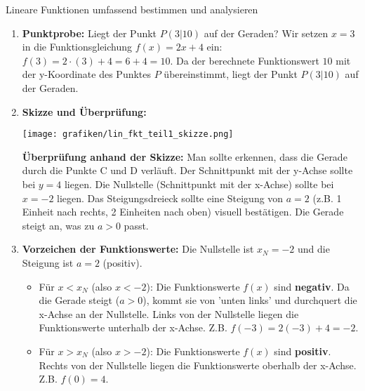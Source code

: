 \begin{loesungsumgebung}{Lineare Funktionen umfassend bestimmen und analysieren}
\begin{enumerate}[label=(\alph*)]
    \item \textbf{Punktprobe:} Liegt der Punkt $P(3|10)$ auf der Geraden?
    Wir setzen $x=3$ in die Funktionsgleichung $f(x) = 2x+4$ ein:
    $f(3) = 2 \cdot (3) + 4 = 6 + 4 = 10$.
    Da der berechnete Funktionswert $10$ mit der y-Koordinate des Punktes $P$ übereinstimmt, liegt der Punkt $P(3|10)$ auf der Geraden.

    \item \textbf{Skizze und Überprüfung:}
    \begin{center}
    \texttt{[image: grafiken/lin\_fkt\_teil1\_skizze.png]}
    \label{fig:lin_fkt_teil1}
    \end{center}
    \textbf{Überprüfung anhand der Skizze:} Man sollte erkennen, dass die Gerade durch die Punkte C und D verläuft. Der Schnittpunkt mit der y-Achse sollte bei $y=4$ liegen. Die Nullstelle (Schnittpunkt mit der x-Achse) sollte bei $x=-2$ liegen. Das Steigungsdreieck sollte eine Steigung von $a=2$ (z.B. 1 Einheit nach rechts, 2 Einheiten nach oben) visuell bestätigen. Die Gerade steigt an, was zu $a>0$ passt.

    \item \textbf{Vorzeichen der Funktionswerte:}
    Die Nullstelle ist $x_N = -2$ und die Steigung ist $a=2$ (positiv).
    \begin{itemize}
        \item Für $x < x_N$ (also $x < -2$): Die Funktionswerte $f(x)$ sind \textbf{negativ}. Da die Gerade steigt ($a>0$), kommt sie von 'unten links' und durchquert die x-Achse an der Nullstelle. Links von der Nullstelle liegen die Funktionswerte unterhalb der x-Achse. Z.B. $f(-3) = 2(-3)+4 = -2$.
        \item Für $x > x_N$ (also $x > -2$): Die Funktionswerte $f(x)$ sind \textbf{positiv}. Rechts von der Nullstelle liegen die Funktionswerte oberhalb der x-Achse. Z.B. $f(0) = 4$.
    \end{itemize}
\end{enumerate}


\end{loesungsumgebung}
